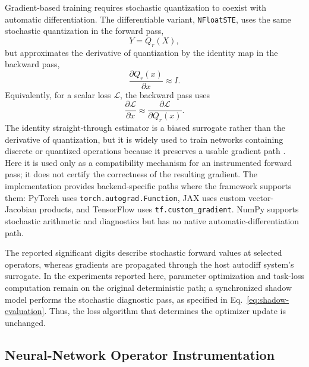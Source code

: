 \documentclass[manuscript, screen]{acmart}
\begin{document}
Gradient-based training requires stochastic quantization to coexist with automatic differentiation. The differentiable variant, \texttt{NFloatSTE}, uses the same stochastic quantization in the forward pass,
\begin{equation}
Y = Q_r(X),
\end{equation}
but approximates the derivative of quantization by the identity map in the backward pass,
\begin{equation}
\frac{\partial Q_r(x)}{\partial x}\approx I.
\end{equation}
Equivalently, for a scalar loss $\mathcal{L}$, the backward pass uses
\begin{equation}
\frac{\partial \mathcal{L}}{\partial x}
\approx
\frac{\partial \mathcal{L}}{\partial Q_r(x)}.
\end{equation}
The identity straight-through estimator is a biased surrogate rather than the derivative of quantization, but it is widely used to train networks containing discrete or quantized operations because it preserves a usable gradient path \cite{bengio2013estimating}. Here it is used only as a compatibility mechanism for an instrumented forward pass; it does not certify the correctness of the resulting gradient. The implementation provides backend-specific paths where the framework supports them: PyTorch uses \texttt{torch.autograd.Function}, JAX uses custom vector-Jacobian products, and TensorFlow uses \texttt{tf.custom\_gradient}. NumPy supports stochastic arithmetic and diagnostics but has no native automatic-differentiation path.

The reported significant digits describe stochastic forward values at selected operators, whereas gradients are propagated through the host autodiff system's surrogate. In the experiments reported here, parameter optimization and task-loss computation remain on the original deterministic path; a synchronized shadow model performs the stochastic diagnostic pass, as specified in Eq.~\eqref{eq:shadow-evaluation}. Thus, the loss algorithm that determines the optimizer update is unchanged.

\subsection{Neural-Network Operator Instrumentation}
\end{document}
